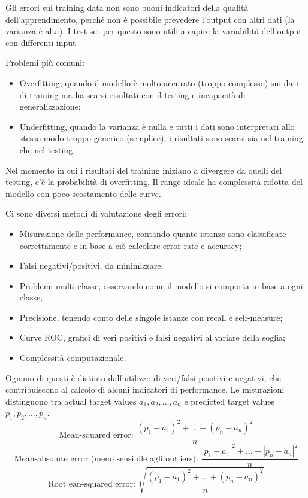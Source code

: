 Gli errori sul training data non sono buoni indicatori della qualità dell'apprendimento, perché non è possibile prevedere l'output con altri dati (la varianza è alta). I test set per questo sono utili a capire la variabilità dell'output con differenti input.

Problemi più comuni:
\begin{itemize}
	\item Overfitting, quando il modello è molto accurato (troppo complesso) sui dati di training ma ha scarsi risultati con il testing e incapacità di generalizzazione;
	\item Underfitting, quando la varianza è nulla e tutti i dati sono interpretati allo stesso modo troppo generico (semplice), i risultati sono scarsi sia nel training che nel testing.
\end{itemize}

Nel momento in cui i risultati del training iniziano a divergere da quelli del testing, c'è la probabilità di overfitting. Il range ideale ha complessità ridotta del modello con poco scostamento delle curve.

Ci sono diversi metodi di valutazione degli errori:
\begin{itemize}
	\item Misurazione delle performance, contando quante istanze sono classificate correttamente e in base a ciò calcolare error rate e accuracy;
	\item Falsi negativi/positivi, da minimizzare;
	\item Problemi multi-classe, osservando come il modello si comporta in base a ogni classe;
	\item Precisione, tenendo conto delle singole istanze con recall e self-measure;
	\item Curve ROC, grafici di veri positivi e falsi negativi al variare della soglia;
	\item Complessità computazionale.
\end{itemize}

Ognuno di questi è distinto dall'utilizzo di veri/falsi positivi e negativi, che contribuiscono al calcolo di alcuni indicatori di performance. Le misurazioni distinguono tra actual target values $a_1, a_2, \dots, a_n$ e predicted target values $p_1, p_2, \dots, p_n$.
$$\text{Mean-squared error: } \frac{(p_1 - a_1)^2 + \dots + (p_n - a_n)^2}{n}$$
$$\text{Mean-absolute error (meno sensibile agli outliers): } \frac{|p_1 - a_1|^2 + \dots + |p_n - a_n|^2}{n}$$
$$\text{Root ean-squared error: } \sqrt{\frac{(p_1 - a_1)^2 + \dots + (p_n - a_n)^2}{n}}$$

